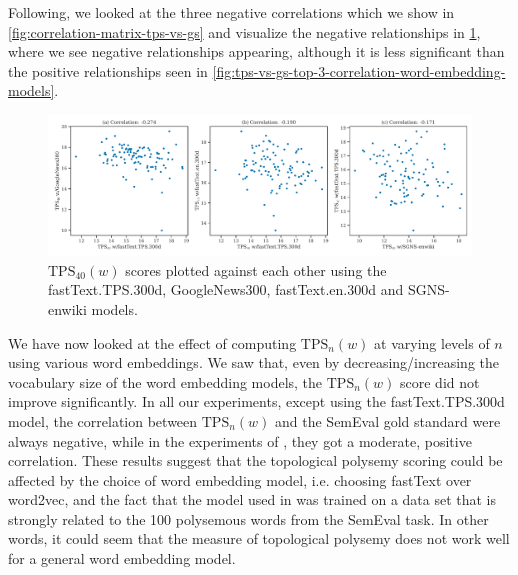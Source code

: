 Following, we looked at the three negative correlations which we show in \cref{fig:correlation-matrix-tps-vs-gs} and visualize the negative relationships in \cref{fig:tps-vs-gs-top-3-negative-correlation-word-embedding-models}, where we see negative relationships appearing, although it is less significant than the positive relationships seen in \cref{fig:tps-vs-gs-top-3-correlation-word-embedding-models}.
\begin{figure}[H]
    \centering
    \includegraphics[width=\textwidth]{thesis/figures/tps-vs-gs-top-3-negative-correlation-word-embedding-models.pdf}
    \caption{$\text{TPS}_{40}(w)$ scores plotted against each other using the fastText.TPS.300d, GoogleNews300, fastText.en.300d and SGNS-enwiki models.}
    \label{fig:tps-vs-gs-top-3-negative-correlation-word-embedding-models}
\end{figure}

We have now looked at the effect of computing $\text{TPS}_n(w)$ at varying levels of $n$ using various word embeddings. We saw that, even by decreasing/increasing the vocabulary size of the word embedding models, the $\text{TPS}_n(w)$ score did not improve significantly. In all our experiments, except using the fastText.TPS.300d model, the correlation between $\text{TPS}_n(w)$ and the SemEval gold standard were always negative, while in the experiments of \cite{jakubowski2020topology}, they got a moderate, positive correlation. These results suggest that the topological polysemy scoring could be affected by the choice of word embedding model, i.e. choosing fastText over word2vec, and the fact that the model used in \cite{jakubowski2020topology} was trained on a data set that is strongly related to the 100 polysemous words from the SemEval task. In other words, it could seem that the measure of topological polysemy does not work well for a general word embedding model.


